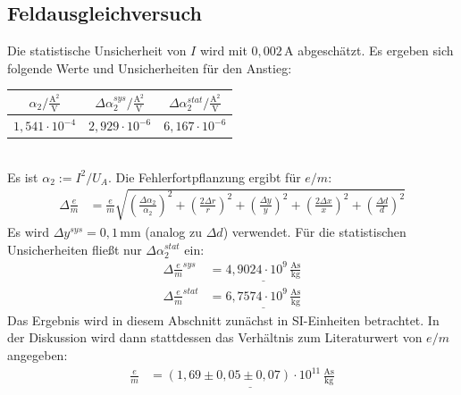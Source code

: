 \documentclass[a4paper,12pt]{article}
\newcommand{\kla}{}
\begin{document}
\subsection{Feldausgleichversuch}
Die statistische Unsicherheit von $I$ wird mit $0,002\,$A abgeschätzt. Es ergeben sich folgende Werte und Unsicherheiten für den Anstieg:
\begin{table}[h!]
\centering
\begin{tabular}{c|c|c}
$\alpha_2 / \frac{\mathrm{A}^2}{\mathrm{V}}$ & $\Delta \alpha_2^{sys} / \frac{\mathrm{A}^2}{\mathrm{V}}$ & $\Delta \alpha_2^{stat} / \frac{\mathrm{A}^2}{\mathrm{V}}$ \\ \hline
$1,541\cdot 10^{-4}$&$2,929\cdot 10^{-6}$&$6,167\cdot 10^{-6}$\\
\end{tabular}
\end{table}\\
Es ist $\alpha_2:=I^2/U_A$. Die Fehlerfortpflanzung ergibt für $e/m$:
\begin{align*}
\Delta\frac{e}{m}&=\frac{e}{m}\sqrt{\kla\left( {\frac{\Delta\alpha_2}{\alpha_2}} \right)^2+\kla\left( \frac{2\Delta r}{r} \right)^2+\kla\left( {\frac{\Delta y}{y}} \right)^2+\kla\left( {\frac{2\Delta x}{x}} \right)^2+\kla\left( {\frac{\Delta d}{d}} \right)^2}
\end{align*}
Es wird $\Delta y^{sys}=0,1\,$mm (analog zu $\Delta d$) verwendet. Für die statistischen Unsicherheiten fließt nur $\Delta\alpha_2^{stat}$ ein:
\begin{align*}
\Delta\frac{e}{m}^{sys}&=\underline{4,9024\cdot 10^{9}\,\frac{\mathrm{As}}{\mathrm{kg}}}\\
\Delta\frac{e}{m}^{stat}&=\underline{6,7574\cdot 10^{9}\,\frac{\mathrm{As}}{\mathrm{kg}}}
\end{align*}
Das Ergebnis wird in diesem Abschnitt zunächst in SI-Einheiten betrachtet. In der Diskussion wird dann stattdessen das Verhältnis zum Literaturwert von $e/m$ angegeben:
\begin{align*}
\frac{e}{m}&=\underline{(1,69\pm 0,05\pm 0,07)\cdot 10^{11}\,\frac{\mathrm{As}}{\mathrm{kg}}}
\end{align*}
\end{document}
